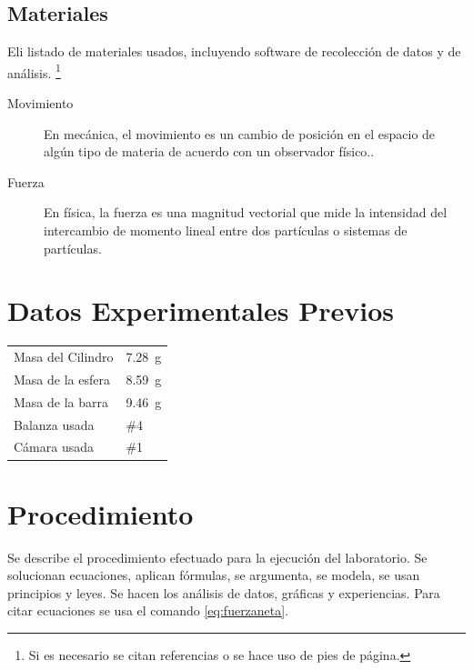 \documentclass{article}
\begin{document}
 \subsection{Materiales}
 
 Eli listado de materiales usados, incluyendo software de recolección de datos y de análisis. \footnote{Si es necesario se citan referencias o se hace uso de pies de página.}
 
\label{definitiones} %
\begin{description}
\item[Movimiento]
En mecánica, el movimiento es un cambio de posición en el espacio de algún tipo de materia de acuerdo con un observador físico..
\item[Fuerza]
En física, la fuerza es una magnitud vectorial que mide la intensidad del intercambio de momento lineal entre dos partículas o sistemas de partículas.
\end{description} 

 

\section{Datos Experimentales Previos} %

\begin{tabular}{ll}
Masa del Cilindro & \SI{7.28}{g}\\
Masa de la esfera & \SI{8.59}{g}\\
Masa de la barra & \SI{9.46}{g}\\
Balanza usada & \#4\\
Cámara usada & \#1
\end{tabular}


\section{Procedimiento} %

Se describe el procedimiento efectuado para la ejecución del laboratorio. Se solucionan ecuaciones, aplican fórmulas, se argumenta, se modela, se usan principios y leyes. Se hacen los análisis de datos, gráficas y experiencias. Para citar ecuaciones se usa el comando \ref{eq:fuerzaneta}.%
\end{document}
